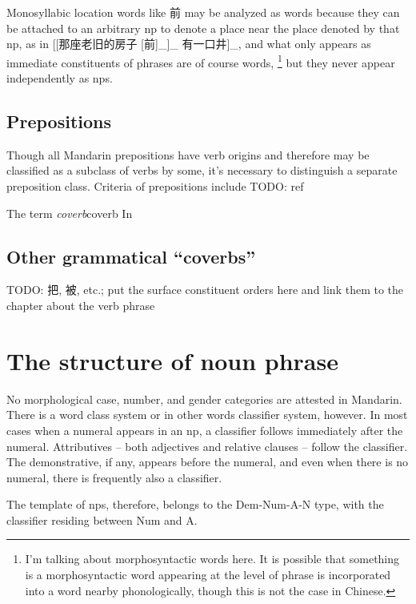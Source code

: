 \documentclass[UTF8, a4paper, oneside, scheme=plain]{ctexrep}
\newcommand*{\term}[1]{\emph{#1}}
\begin{document}
Monosyllabic location words like 前 may be analyzed as words 
because they can be attached to an arbitrary \ac{np} 
to denote a place near the place denoted by that \ac{np},
as in [[那座老旧的房子 [前]_{}]_{} 有一口井]_{},
and what only appears as immediate constituents of phrases are of course words,%
\footnote{
    I'm talking about morphosyntactic words here.
    It is possible that something is a morphosyntactic word 
    appearing at the level of phrase
    is incorporated into a word nearby phonologically,
    though this is not the case in Chinese.
}%
but they never appear independently as \ac{np}s.


\section{Prepositions}\label{sec:preposition-pos}

Though all Mandarin prepositions have verb origins 
and therefore may be classified as a subclass of verbs by some,
it's necessary to distinguish a separate preposition class.
Criteria of prepositions include TODO: ref

\begin{infobox}{The term \term{coverb}}{coverb}
    In 
\end{infobox}

\section{Other grammatical ``coverbs''}

TODO: 把, 被, etc.; put the surface constituent orders here 
and link them to the chapter about the verb phrase

\chapter{The structure of noun phrase}

No morphological case, number, and gender categories are attested in Mandarin.
There is a word class system or in other words classifier system, however.
In most cases when a numeral appears in an \ac{np},
a classifier follows immediately after the numeral.
Attributives -- both adjectives and relative clauses -- 
follow the classifier. %
The demonstrative, if any, appears before the numeral,
and even when there is no numeral,
there is frequently also a classifier.

The template of \ac{np}s, therefore, belongs to the 
Dem-Num-A-N type,
with the classifier residing between Num and A. 
\end{document}
